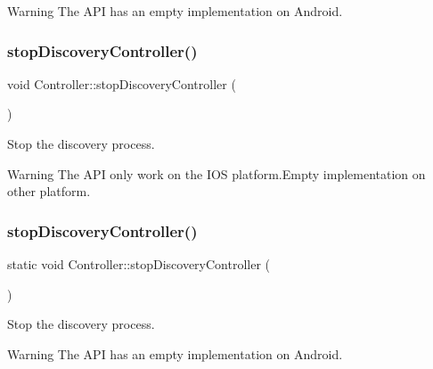 \begin{DoxyWarning}{Warning}
The A\+PI has an empty implementation on Android. 
\end{DoxyWarning}
\mbox{\label{classController_a56e523730da3b75bed4597ef87ec0495}} 
\subsubsection{\texorpdfstring{stop\+Discovery\+Controller()}{stopDiscoveryController()}\hspace{0.1cm}{\footnotesize\ttfamily [1/2]}}
{\footnotesize\ttfamily void Controller\+::stop\+Discovery\+Controller (\begin{DoxyParamCaption}{ }\end{DoxyParamCaption})\hspace{0.3cm}{\ttfamily [static]}}

Stop the discovery process.

\begin{DoxyWarning}{Warning}
The A\+PI only work on the I\+OS platform.\+Empty implementation on other platform. 
\end{DoxyWarning}
\mbox{\label{classController_a525207ef12be4dfa7ca89461c20db976}} 
\subsubsection{\texorpdfstring{stop\+Discovery\+Controller()}{stopDiscoveryController()}\hspace{0.1cm}{\footnotesize\ttfamily [2/2]}}
{\footnotesize\ttfamily static void Controller\+::stop\+Discovery\+Controller (\begin{DoxyParamCaption}{ }\end{DoxyParamCaption})\hspace{0.3cm}{\ttfamily [static]}}

Stop the discovery process.

\begin{DoxyWarning}{Warning}
The A\+PI has an empty implementation on Android. 
\end{DoxyWarning}


